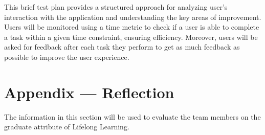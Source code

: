 \documentclass[12pt, titlepage]{article}
\begin{document}
This brief test plan provides a structured approach for analyzing user's interaction with the application and understanding the key areas of improvement. Users will be monitored using a time metric to check if a user is able to complete a task within a given time constraint, ensuring efficiency. Moreover, users will be asked for feedback after each task they perform to get as much feedback as possible to improve the user experience.  

\newpage{}
\section*{Appendix --- Reflection}


The information in this section will be used to evaluate the team members on the
graduate attribute of Lifelong Learning.


\end{document}
